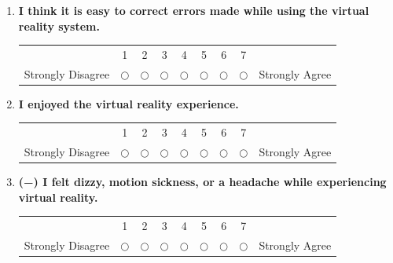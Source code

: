 \documentclass[inscr,ack,preface]{dithesis}
\begin{document}
\begin{appendix}
\begin{enumerate}
    \item \begin{minipage}[t]{\linewidth}
            \textbf{I think it is easy to correct errors made while using the virtual reality system.}
            \begin{center}
              \small
              \renewcommand{\arraystretch}{1.5}
              \begin{tabular}{ccccccccc}
                                  & 1          & 2          & 3          & 4          & 5          & 6          & 7          &                \\
                Strongly Disagree & $\bigcirc$ & $\bigcirc$ & $\bigcirc$ & $\bigcirc$ & $\bigcirc$ & $\bigcirc$ & $\bigcirc$ & Strongly Agree
              \end{tabular}
            \end{center}
          \end{minipage}


    \item \begin{minipage}[t]{\linewidth}
            \textbf{I enjoyed the virtual reality experience.}
            \begin{center}
              \small
              \renewcommand{\arraystretch}{1.5}
              \begin{tabular}{ccccccccc}
                                  & 1          & 2          & 3          & 4          & 5          & 6          & 7          &                \\
                Strongly Disagree & $\bigcirc$ & $\bigcirc$ & $\bigcirc$ & $\bigcirc$ & $\bigcirc$ & $\bigcirc$ & $\bigcirc$ & Strongly Agree
              \end{tabular}
            \end{center}
          \end{minipage}


    \item \begin{minipage}[t]{\linewidth}
            \textbf{(−) I felt dizzy, motion sickness, or a headache while experiencing virtual reality.}
            \begin{center}
              \small
              \renewcommand{\arraystretch}{1.5}
              \begin{tabular}{ccccccccc}
                                  & 1          & 2          & 3          & 4          & 5          & 6          & 7          &                \\
                Strongly Disagree & $\bigcirc$ & $\bigcirc$ & $\bigcirc$ & $\bigcirc$ & $\bigcirc$ & $\bigcirc$ & $\bigcirc$ & Strongly Agree
              \end{tabular}
            \end{center}
          \end{minipage}



\end{enumerate}
\end{appendix}
\end{document}
